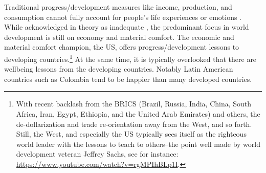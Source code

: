 \documentclass[10pt, letterpaper]{article}
\newcommand{\emd}[1]{\ExecuteMetaData[/tmp/tex]{#1}} %
\begin{document}
\begin{spacing}{2} %








 Traditional
progress/development 
 measures like
income, production, and consumption cannot fully account for people's life
experiences %
 or emotions \citep{diener09,stiglitz09al,lambert2020towards}.
% 
 While acknowledged in theory as inadequate%
, the predominant focus in world development is
 still on economy and material comfort. The economic and material comfort
 champion, the US, offers progress/development lessons to developing countries.\footnote{With recent backlash from the BRICS (Brazil, Russia,
   India, China, South Africa, Iran, Egypt, Ethiopia, and the United Arab
   Emirates) and others, the de-dollarization and trade re-orientation away from
   the West, and so forth. Still, the West, and especially the US typically sees itself as
 the righteous world leader with the lessons to teach to others--the point well
 made by world development veteran Jeffrey Sachs, see for instance: \url{https://www.youtube.com/watch?v=rgMPIhBLp1I}.} 
 At the same time, it is typically overlooked that there
 are wellbeing lessons from the developing countries. Notably Latin American
 countries such as Colombia tend to be happier than many developed countries. %


\end{spacing}
\end{document}
